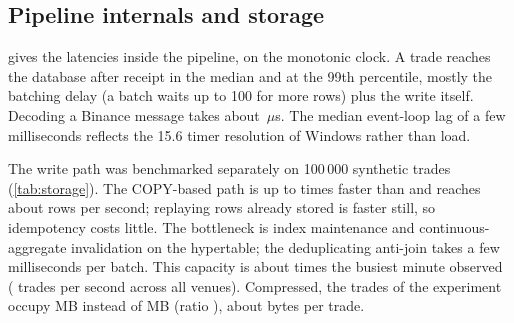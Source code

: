 \subsection{Pipeline internals and storage}

 gives the latencies inside the pipeline, on the monotonic clock. A trade reaches the
database \IngestQuietPfifty\ms{} after receipt in the median and \IngestQuietPninetynine\ms{} at the 99th
percentile, mostly the batching delay (a batch waits up to 100\ms{} for more rows) plus the write itself.
Decoding a Binance message takes about \ParseBinancePfiftyUs\,$\mu$s. The median event-loop lag of a few
milliseconds reflects the 15.6\ms{} timer resolution of Windows rather than load.

\begin{table}[ht]
\centering
\caption{Internal latencies (ms), from Prometheus histograms, per analysis window (the fault-injection window
excludes the suspension).}
\label{tab:internal}
\small

\end{table}

The write path was benchmarked separately on 100\,000 synthetic trades (\cref{tab:storage}). The COPY-based
path is up to \BenchSpeedupMax{} times faster than  and reaches about \BenchBestRowsPerS{} rows
per second; replaying rows already stored is faster still, so idempotency costs little. The bottleneck is
index maintenance and continuous-aggregate invalidation on the hypertable; the deduplicating anti-join takes a
few milliseconds per batch. This capacity is about \CapacityRatio{} times the busiest minute observed
(\BusiestTradesPerS{} trades per second across all venues). Compressed, the
\TradesRows{} trades of the experiment occupy \TradesMBCompressed{} MB instead of \TradesMBUncompressed{} MB
(ratio \CompressionRatio), about \BytesPerTradeCompressed{} bytes per trade.

\begin{table}[ht]
\centering
\caption{Write throughput (rows per second) of the two insert strategies, on fresh rows and on a full replay
of rows already stored.}
\label{tab:storage}
\small

\end{table}
